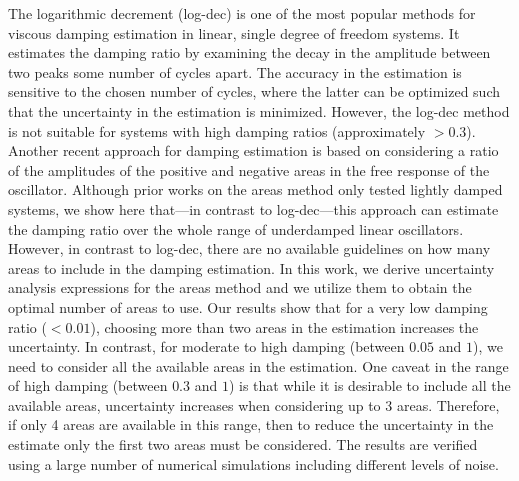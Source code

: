 The logarithmic decrement (log-dec) is one of the most popular methods for viscous damping estimation in linear, single degree of freedom systems. 
It estimates the damping ratio by examining the decay in the amplitude between two peaks some number of cycles apart. 
The accuracy in the estimation is sensitive to the chosen number of cycles, where the latter can be optimized such that the uncertainty in the estimation is minimized. 
However, the log-dec method is not suitable for systems with high damping ratios (approximately $>0.3$).  
Another recent approach for damping estimation is based on considering a ratio of the amplitudes of the positive and negative areas in the free response of the oscillator. 
Although prior works on the areas method only tested lightly damped systems, we show here that---in contrast to log-dec---this approach can estimate the damping ratio over the whole range of underdamped linear oscillators. 
However, in contrast to log-dec, there are no available guidelines on how many areas to include in the damping estimation. 
In this work, we derive uncertainty analysis expressions for the areas method and we utilize them to obtain the optimal number of areas to use. 
Our results show that for a very low damping ratio ($<0.01$), choosing more than two areas in the estimation increases the uncertainty. 
In contrast, for moderate to high damping (between $0.05$ and $1$), we need to consider all the available areas in the estimation. 
One caveat in the range of high damping (between $0.3$ and $1$) is that while it is desirable to include all the available areas, uncertainty increases when considering up to 3 areas. 
Therefore, if only 4 areas are available in this range, then to reduce the uncertainty in the estimate only the first two areas must be considered. 
The results are verified using a large number of numerical simulations including different levels of noise. 
